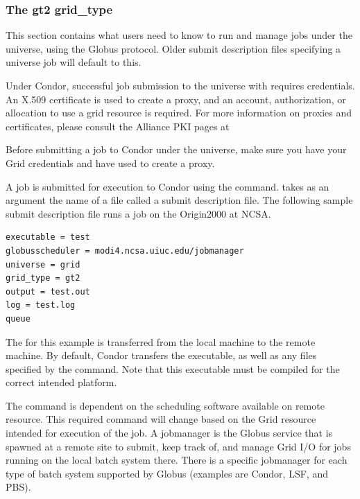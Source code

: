 \subsubsection{\label{sec:Using-gt2}The gt2 grid\_type}

This section contains what users need to know to 
run and manage jobs under the  universe, using the Globus  protocol.
Older submit description files specifying a  universe job
will default to this.

Under Condor, successful job submission to the  universe with 
requires credentials.
An X.509 certificate is used to create a proxy,
and an account, authorization, or allocation to use a grid resource
is required.
For more information on proxies and certificates,
please consult the Alliance PKI pages at 


Before submitting a job to Condor under the  universe,
make sure you have your Grid 
credentials and have used  to create a proxy.

A job is submitted for execution to Condor using the
 command.
 takes as an argument
the name of a file called a submit description file.
The following sample submit description file runs a job on
the Origin2000 at NCSA.

\begin{verbatim}
executable = test
globusscheduler = modi4.ncsa.uiuc.edu/jobmanager
universe = grid
grid_type = gt2
output = test.out
log = test.log
queue
\end{verbatim} 

The 
for this example is
transferred from the local machine to the remote machine.
By default, Condor transfers the executable, as well as any
files specified by the  command.
Note that this executable must be compiled for the correct
intended platform.

The  command is dependent on the
scheduling software available on remote resource.
This required command will change based on the Grid resource
intended for execution of the job.
A jobmanager is the Globus service that is spawned at a remote site to
submit, keep track of, and manage Grid I/O for jobs running on the local
batch system there.
There is a specific jobmanager for each type of
batch system supported by Globus (examples are Condor, LSF, and PBS).

